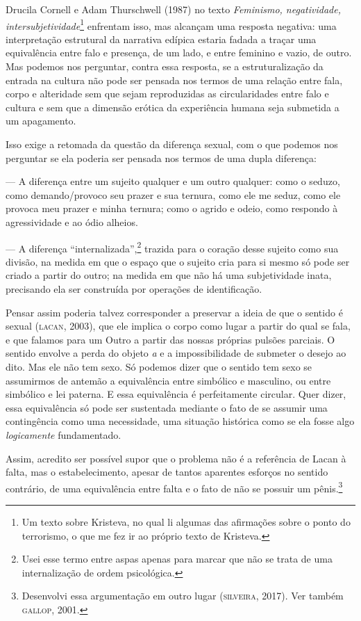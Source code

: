 Drucila Cornell e Adam Thurschwell (1987) no texto \emph{Feminismo,
negatividade, intersubjetividade}\footnote{Um texto sobre Kristeva, no
  qual li algumas das afirmações sobre o ponto do terrorismo, o que me
  fez ir ao próprio texto de Kristeva.} enfrentam isso, mas alcançam uma
resposta negativa: uma interpretação estrutural da narrativa edípica
estaria fadada a traçar uma equivalência entre falo e presença, de um
lado, e entre feminino e vazio, de outro. Mas podemos nos perguntar,
contra essa resposta, se a estruturalização da entrada na cultura não
pode ser pensada nos termos de uma relação entre fala, corpo e
alteridade sem que sejam reproduzidas as circularidades entre falo e
cultura e sem que a dimensão erótica da experiência humana seja
submetida a um apagamento.

Isso exige a retomada da questão da diferença sexual, com o que podemos
nos perguntar se ela poderia ser pensada nos termos de uma dupla
diferença:

--- A diferença entre um sujeito qualquer e um outro qualquer: como o
seduzo, como demando/provoco seu prazer e sua ternura, como ele me
seduz, como ele provoca meu prazer e minha ternura; como o agrido e
odeio, como respondo à agressividade e ao ódio alheios.

--- A diferença ``internalizada'',\footnote{Usei esse termo entre aspas
  apenas para marcar que não se trata de uma internalização de ordem
  psicológica.} trazida para o coração desse sujeito como sua divisão,
na medida em que o espaço que o sujeito cria para si mesmo só pode ser
criado a partir do outro; na medida em que não há uma subjetividade
inata, precisando ela ser construída por operações de identificação.

Pensar assim poderia talvez corresponder a preservar a ideia de que o
sentido é sexual (\textsc{lacan}, 2003), que ele implica o corpo como lugar
a partir do qual se fala, e que falamos para um Outro a partir das
nossas próprias pulsões parciais. O sentido envolve a perda do objeto
\emph{a} e a impossibilidade de submeter o desejo ao dito. Mas ele não
tem sexo. Só podemos dizer que o sentido tem sexo se assumirmos de
antemão a equivalência entre simbólico e masculino, ou entre simbólico e
lei paterna. E essa equivalência é perfeitamente circular. Quer dizer,
essa equivalência só pode ser sustentada mediante o fato de se assumir
uma contingência como uma necessidade, uma situação histórica como se
ela fosse algo \emph{logicamente} fundamentado.

Assim, acredito ser possível supor que o problema não é a referência de
Lacan à falta, mas o estabelecimento, apesar de tantos aparentes
esforços no sentido contrário, de uma equivalência entre falta e o fato
de não se possuir um pênis.\footnote{Desenvolvi essa argumentação em
  outro lugar (\textsc{silveira}, 2017). Ver também \textsc{gallop}, 2001.}

